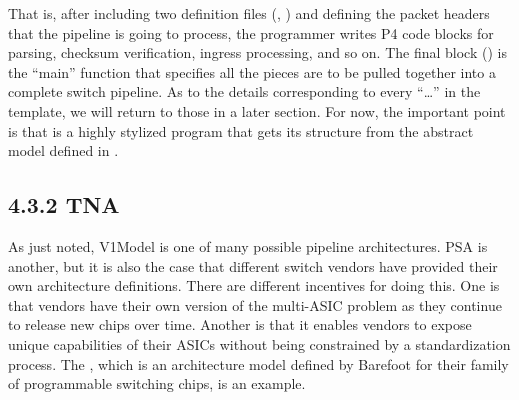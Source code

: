 \documentclass[letterpaper,11pt,english]{sphinxmanual}
\begin{document}
\begin{sphinxVerbatim}[commandchars=\\\{\}]
 
                  
                   

 
                  
                   

 
\end{sphinxVerbatim}

That is, after including two definition files (,
) and defining the packet headers that the pipeline is
going to process, the programmer writes P4 code blocks for parsing,
checksum verification, ingress processing, and so on. The final block
() is the “main” function that specifies all the pieces
are to be pulled together into a complete switch pipeline. As to the
details corresponding to every “…” in the template, we will return
to those in a later section. For now, the important point is that
 is a highly stylized program that gets its structure
from the abstract model defined in .


\subsection{4.3.2 TNA}
\label{\detokenize{switch:tna}}
As just noted, V1Model is one of many possible pipeline
architectures. PSA is another, but it is also the case that different
switch vendors have provided their own architecture definitions. There
are different incentives for doing this. One is that vendors have
their own version of the multi-ASIC problem as they continue to
release new chips over time. Another is that it enables vendors to
expose unique capabilities of their ASICs without being constrained by
a standardization process. The ,
which is an architecture model defined by Barefoot for their family of
programmable switching chips, is an example.
\end{document}
